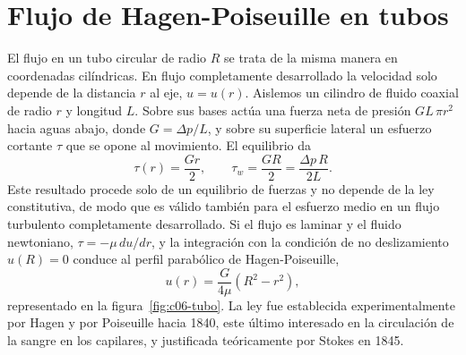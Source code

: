 \documentclass[10pt,openany]{book}
\begin{document}
\section{Flujo de Hagen-Poiseuille en tubos}

El flujo en un tubo circular de radio \(R\) se trata de la misma manera en coordenadas cilíndricas. En flujo completamente desarrollado la velocidad solo depende de la distancia \(r\) al eje, \(u = u(r)\). Aislemos un cilindro de fluido coaxial de radio \(r\) y longitud \(L\). Sobre sus bases actúa una fuerza neta de presión \(G L\,\pi r^{2}\) hacia aguas abajo, donde \(G = \Delta p/L\), y sobre su superficie lateral un esfuerzo cortante \(\tau\) que se opone al movimiento. El equilibrio da
\begin{equation}
\tau(r) = \frac{G r}{2}, \qquad \tau_w = \frac{G R}{2} = \frac{\Delta p\,R}{2L}. \label{eq:c06-tau}
\end{equation}
Este resultado procede solo de un equilibrio de fuerzas y no depende de la ley constitutiva, de modo que es válido también para el esfuerzo medio en un flujo turbulento completamente desarrollado. Si el flujo es laminar y el fluido newtoniano, \(\tau = -\mu\,du/dr\), y la integración con la condición de no deslizamiento \(u(R) = 0\) conduce al perfil parabólico de Hagen-Poiseuille,
\begin{equation}
u(r) = \frac{G}{4\mu}\left(R^{2} - r^{2}\right), \label{eq:c06-perfil-tubo}
\end{equation}
representado en la figura~\ref{fig:c06-tubo}. La ley fue establecida experimentalmente por Hagen y por Poiseuille hacia 1840, este último interesado en la circulación de la sangre en los capilares, y justificada teóricamente por Stokes en 1845.
\end{document}
